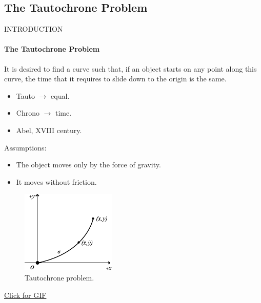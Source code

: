 \subsection{The Tautochrone Problem}
\begin{frame}{INTRODUCTION}
    \framesubtitle{The Tautochrone Problem}
    It is desired to find a curve such that, if an object starts on any point along this curve, the time that it requires to slide down to the origin is the same.
    
    \begin{multicols}{2}
    \begin{itemize}
        \item Tauto $\rightarrow$ equal.
        \item Chrono $\rightarrow$ time.
        \item Abel, XVIII century.
    \end{itemize}
    Assumptions:
    \begin{itemize}
        \item The object moves only by the force of gravity.
        \item It moves without friction.
    \end{itemize}
    \columnbreak
    \begin{figure}[H]
        \centering
        \includegraphics[scale=1.25]{files/taut.pdf}
        \caption{Tautochrone problem.}
    \end{figure}
    
    \end{multicols}
    \begin{center}
    \href{run:gify.gif}{Click for GIF}
    \end{center}
    
\end{frame}


